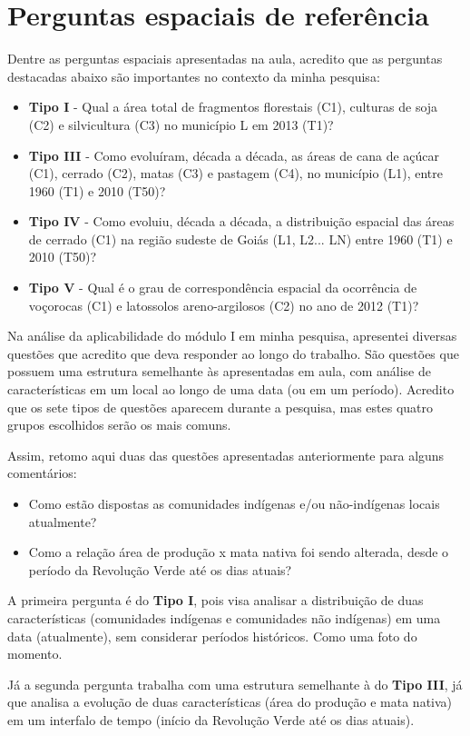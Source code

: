 \section{Perguntas espaciais de referência}

Dentre as perguntas espaciais apresentadas na aula, acredito que as perguntas destacadas abaixo são importantes no contexto da minha pesquisa:

\begin{itemize}
\item \textbf{Tipo I} - Qual a área total de fragmentos florestais (C1), culturas de soja (C2) e silvicultura (C3) no município L em 2013 (T1)?
\item \textbf{Tipo III} - Como evoluíram, década a década, as áreas de cana de açúcar (C1), cerrado (C2), matas (C3) e pastagem (C4), no município (L1), entre 1960 (T1) e 2010 (T50)?
\item \textbf{Tipo IV} - Como evoluiu, década a década, a distribuição espacial das áreas de cerrado (C1) na região sudeste de Goiás (L1, L2... LN) entre 1960 (T1) e 2010 (T50)?
\item \textbf{Tipo V} - Qual é o grau de correspondência espacial da ocorrência de voçorocas (C1) e latossolos areno-argilosos (C2) no ano de 2012 (T1)?
\end{itemize}

Na análise da aplicabilidade do módulo I em minha pesquisa, apresentei diversas questões que acredito que deva responder ao longo do trabalho. São questões que possuem uma estrutura semelhante às apresentadas em aula, com análise de características em um local ao longo de uma data (ou em um período). Acredito que os sete tipos de questões aparecem durante a pesquisa, mas estes quatro grupos escolhidos serão os mais comuns.

Assim, retomo aqui duas das questões apresentadas anteriormente para alguns comentários:

\begin{itemize}
  \item Como estão dispostas as comunidades indígenas e/ou não-indígenas locais atualmente?
  \item Como a relação área de produção x mata nativa foi sendo alterada, desde o período da Revolução Verde até os dias atuais?
\end{itemize}

A primeira pergunta é do \textbf{Tipo I}, pois visa analisar a distribuição de duas características (comunidades indígenas e comunidades não indígenas) em uma data (atualmente), sem considerar períodos históricos. Como uma foto do momento.

Já a segunda pergunta trabalha com uma estrutura semelhante à do \textbf{Tipo III}, já que analisa a evolução de duas características (área do produção e mata nativa) em um interfalo de tempo (início da Revolução Verde até os dias atuais).
